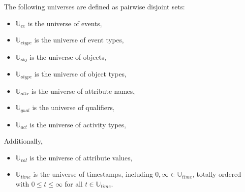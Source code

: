 The following universes are defined as pairwise disjoint sets:
	
	\begin{itemize}[leftmargin=2em]
		\item $\mathbb{U}_{ev}$ is the universe of events,
		\item $\mathbb{U}_{etype}$ is the universe of event types,
		\item $\mathbb{U}_{obj}$ is the universe of objects,
		\item $\mathbb{U}_{otype}$ is the universe of object types,
		\item $\mathbb{U}_{attr}$ is the universe of attribute names,
		\item $\mathbb{U}_{qual}$ is the universe of qualifiers,
        \item $\mathbb{U}_{act}$ is the universe of activity types,
	\end{itemize}
	
	Additionally,
	
	\begin{itemize}[leftmargin=2em]
		\item $\mathbb{U}_{val}$ is the universe of attribute values,
		\item $\mathbb{U}_{time}$ is the universe of timestamps, including $0, \infty \in \mathbb{U}_{time}$, 
		totally ordered with $0 \leq t \leq \infty$ for all $t \in \mathbb{U}_{time}$.
	\end{itemize}
	
